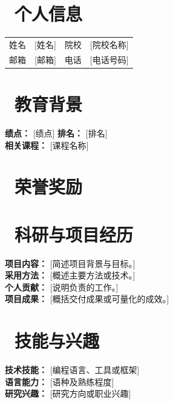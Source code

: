 \documentclass{resume}
\begin{document}
\renewcommand{\arraystretch}{1.2}

\noindent
\begin{minipage}[c]{0.82\textwidth}
    \section*{\faGraduationCap\ 个人信息}
    \begin{tabularx}{\linewidth}{@{}lX lX@{}}
        姓名 & [姓名] & 院校 & [院校名称] \\
        邮箱 & [邮箱] & 电话 & [电话号码] \\
    \end{tabularx}
\end{minipage}\hfill
\begin{minipage}[c]{0.12\textwidth}
\end{minipage}\par

\section{\faHome\ 教育背景}
\datedsubsection{\textbf{[院校名称]}}{[城市]}
\datedsubsection{\textit{[学历与专业]}}{[起止时间]}
\textbf{绩点：} [绩点] \qquad \textbf{排名：} [排名] \\
\textbf{相关课程：} [课程名称]

\section{\faHeartO\ 荣誉奖励}
\datedline{[奖项或奖学金名称]}{[年份]}

\section{\faUsers\ 科研与项目经历}
\datedline{\textbf{[项目名称]}}{[起止时间]}
\textbf{项目内容：} [简述项目背景与目标。] \\
\textbf{采用方法：} [概述主要方法或技术。] \\
\textbf{个人贡献：} [说明负责的工作。] \\
\textbf{项目成果：} [概括交付成果或可量化的成效。]

\section{\faCogs\ 技能与兴趣}
\textbf{技术技能：} [编程语言、工具或框架] \\
\textbf{语言能力：} [语种及熟练程度] \\
\textbf{研究兴趣：} [研究方向或职业兴趣]
\end{document}
